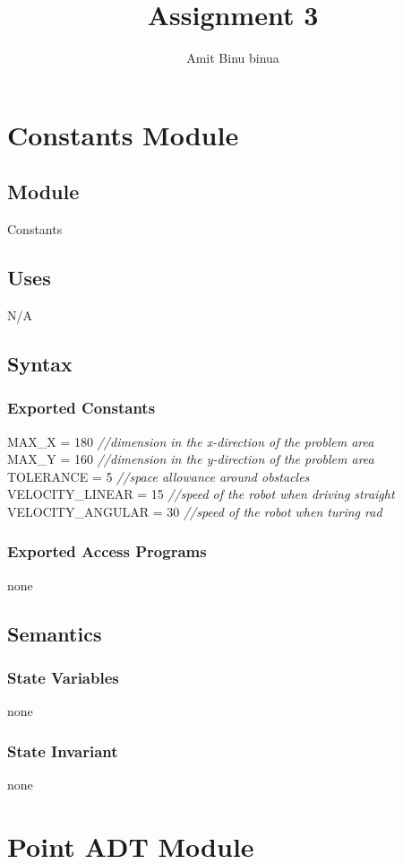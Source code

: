 \documentclass[12pt]{article}
\title{Assignment 3}
\author{Amit Binu     binua}
\begin{document}
\maketitle





\newpage
\section* {Constants Module}
\subsection*{Module}
Constants
\subsection* {Uses}
N/A
\subsection* {Syntax}
\subsubsection* {Exported Constants}
MAX\_X = 180 {\it //dimension in the x-direction of the problem area}\\
MAX\_Y = 160 {\it //dimension in the y-direction of the problem area}\\ 
TOLERANCE = 5 {\it //space allowance around obstacles}\\
VELOCITY\_LINEAR = 15 {\it //speed of the robot when driving straight}\\
VELOCITY\_ANGULAR = 30 {\it //speed of the robot when turing rad}
\subsubsection* {Exported Access Programs}
none
\subsection* {Semantics}
\subsubsection* {State Variables}
none
\subsubsection* {State Invariant}
none
\newpage
\section* {Point ADT Module}
\end{document}
